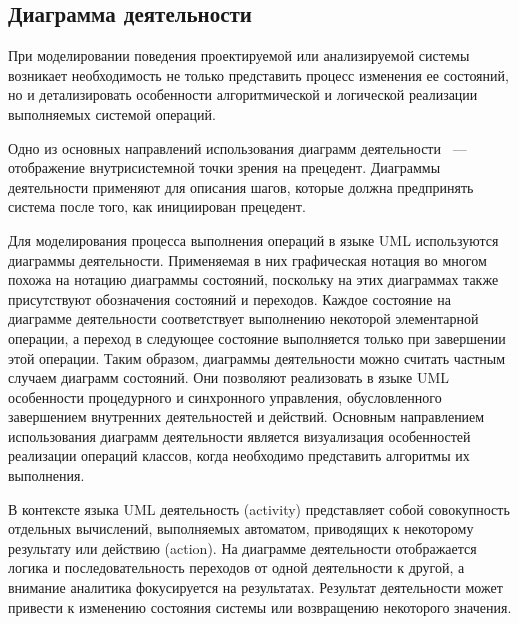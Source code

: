 \subsection{Диаграмма деятельности}

При моделировании поведения проектируемой или анализируемой системы возникает необходимость не только представить процесс изменения ее состояний, но и детализировать особенности алгоритмической и логической реализации выполняемых системой операций.

Одно из основных направлений использования диаграмм деятельности ~--- отображение внутрисистемной точки зрения на прецедент. Диаграммы деятельности применяют для описания шагов, которые должна предпринять система после того, как инициирован прецедент. 

Для моделирования процесса выполнения операций в языке UML используются диаграммы деятельности. Применяемая в них графическая нотация во многом похожа на нотацию диаграммы состояний, поскольку на этих диаграммах также присутствуют обозначения состояний и переходов. Каждое состояние на диаграмме деятельности соответствует выполнению некоторой элементарной операции, а переход в следующее состояние выполняется только при завершении этой операции. Таким образом, диаграммы деятельности можно считать частным случаем диаграмм состояний. Они позволяют реализовать в языке UML особенности процедурного и синхронного управления, обусловленного завершением внутренних деятельностей и действий. Основным направлением использования диаграмм деятельности является визуализация особенностей реализации операций классов, когда необходимо представить алгоритмы их выполнения.

В контексте языка UML деятельность (activity) представляет собой совокупность отдельных вычислений, выполняемых автоматом, приводящих к некоторому результату или действию (action). На диаграмме деятельности отображается логика и последовательность переходов от одной деятельности к другой, а внимание аналитика фокусируется на результатах. Результат деятельности может привести к изменению состояния системы или возвращению некоторого значения.


